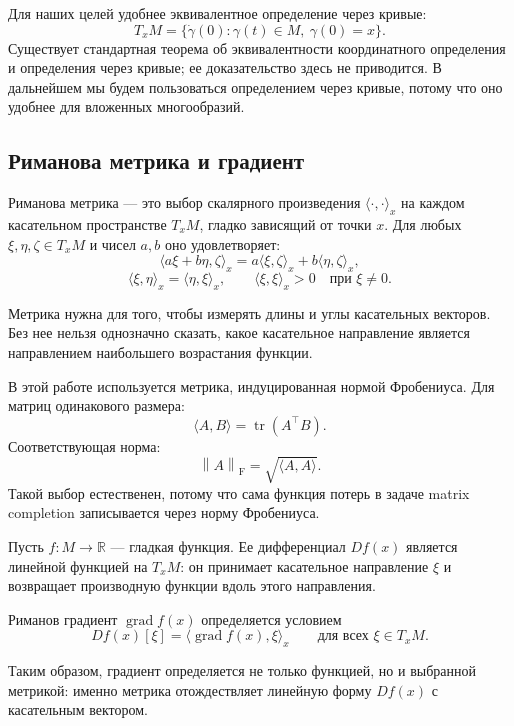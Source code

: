 \documentclass[a4paper,12pt]{article}
\newcommand{\R}{\mathbb{R}}
\newcommand{\fro}[1]{\left\lVert #1 \right\rVert_{\mathrm F}}
\newcommand{\tr}{\operatorname{tr}}
\newcommand{\grad}{\operatorname{grad}}
\begin{document}
Для наших целей удобнее эквивалентное определение через кривые:
\[
    T_xM=\{\dot\gamma(0):\gamma(t)\in M,\ \gamma(0)=x\}.
\]
Существует стандартная теорема об эквивалентности координатного определения и определения через кривые; ее доказательство здесь не приводится. В дальнейшем мы будем пользоваться определением через кривые, потому что оно удобнее для вложенных многообразий.

\subsection{Риманова метрика и градиент}

\begin{definition}
    Риманова метрика --- это выбор скалярного произведения $\langle\cdot,\cdot\rangle_x$ на каждом касательном пространстве $T_xM$, гладко зависящий от точки $x$. Для любых $\xi,\eta,\zeta\in T_xM$ и чисел $a,b$ оно удовлетворяет:
    \[
        \langle a\xi+b\eta,\zeta\rangle_x
        =a\langle\xi,\zeta\rangle_x+b\langle\eta,\zeta\rangle_x,
    \]
    \[
        \langle \xi,\eta\rangle_x=\langle\eta,\xi\rangle_x,\qquad
        \langle\xi,\xi\rangle_x>0\quad \text{при }\xi\ne 0.
    \]
\end{definition}

Метрика нужна для того, чтобы измерять длины и углы касательных векторов. Без нее нельзя однозначно сказать, какое касательное направление является направлением наибольшего возрастания функции.

В этой работе используется метрика, индуцированная нормой Фробениуса. Для матриц одинакового размера:
\[
    \langle A,B\rangle=\tr(A^\top B).
\]
Соответствующая норма:
\[
    \fro{A}=\sqrt{\langle A,A\rangle}.
\]
Такой выбор естественен, потому что сама функция потерь в задаче matrix completion записывается через норму Фробениуса.

Пусть $f:M\to\R$ --- гладкая функция. Ее дифференциал $Df(x)$ является линейной функцией на $T_xM$: он принимает касательное направление $\xi$ и возвращает производную функции вдоль этого направления.

\begin{definition}
    Риманов градиент $\grad f(x)$ определяется условием
    \[
        Df(x)[\xi]=\langle \grad f(x),\xi\rangle_x
        \qquad \text{для всех }\xi\in T_xM.
    \]
\end{definition}

Таким образом, градиент определяется не только функцией, но и выбранной метрикой: именно метрика отождествляет линейную форму $Df(x)$ с касательным вектором.
\end{document}
